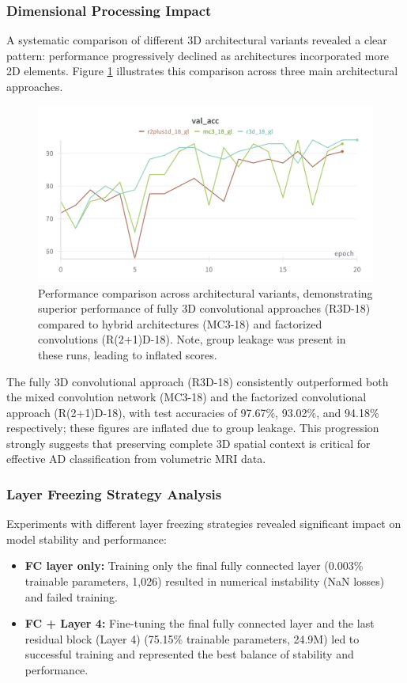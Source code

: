 \documentclass[11pt, a4paper]{article}
\begin{document}
\subsubsection{Dimensional Processing Impact}

A systematic comparison of different 3D architectural variants revealed a clear pattern: performance progressively declined as architectures incorporated more 2D elements. Figure \ref{fig:architecture_comparison_gl} illustrates this comparison across three main architectural approaches.

\begin{figure}[htbp]
  \centering
  \includegraphics[width=\textwidth]{figures/archs_acc_gl.png}
  \caption{Performance comparison across architectural variants, demonstrating superior performance of fully 3D convolutional approaches (R3D-18) compared to hybrid architectures (MC3-18) and factorized convolutions (R(2+1)D-18). Note, group leakage was present in these runs, leading to inflated scores.}
  \label{fig:architecture_comparison_gl}
\end{figure}

The fully 3D convolutional approach (R3D-18) consistently outperformed both the mixed convolution network (MC3-18) and the factorized convolutional approach (R(2+1)D-18), with test accuracies of 97.67\%, 93.02\%, and 94.18\% respectively; these figures are inflated due to group leakage. This progression strongly suggests that preserving complete 3D spatial context is critical for effective AD classification from volumetric MRI data.

\subsubsection{Layer Freezing Strategy Analysis}

Experiments with different layer freezing strategies revealed significant impact on model stability and performance:
\begin{itemize}
    \item \textbf{FC layer only:} Training only the final fully connected layer (0.003\% trainable parameters, 1,026) resulted in numerical instability (NaN losses) and failed training.
    \item \textbf{FC + Layer 4:} Fine-tuning the final fully connected layer and the last residual block (Layer 4) (75.15\% trainable parameters, 24.9M) led to successful training and represented the best balance of stability and performance.
\end{itemize}
\end{document}
